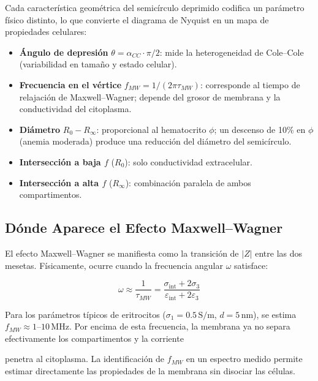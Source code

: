 \documentclass[12pt]{article}
\begin{document}
Cada caracter\'istica geom\'etrica del semic\'irculo deprimido codifica un par\'ametro f\'isico
distinto, lo que convierte el diagrama de Nyquist en un mapa de propiedades celulares:

\begin{itemize}

\item \textbf{\'Angulo de depresi\'on} $\theta = \alpha_{CC}\cdot\pi/2$: mide la
heterogeneidad de Cole--Cole (variabilidad en tama\~{n}o y estado celular).
\item \textbf{Frecuencia en el v\'ertice} $f_{MW} = 1/(2\pi\tau_{MW})$: corresponde al
tiempo de relajaci\'on de Maxwell--Wagner; depende del grosor de membrana y la
conductividad del citoplasma.
\item \textbf{Di\'ametro} $R_0 - R_\infty$: proporcional al hematocrito $\phi$; un
descenso de 10\% en $\phi$ (anemia moderada) produce una reducci\'on del di\'ametro
del semic\'irculo.
\item \textbf{Intersecci\'on a baja $f$} ($R_0$): solo conductividad extracelular.
\item \textbf{Intersecci\'on a alta $f$} ($R_\infty$): combinaci\'on paralela de ambos
compartimentos.
\end{itemize}

\subsection{D\'onde Aparece el Efecto Maxwell--Wagner}

\label{subsec:MW_loc}

El efecto Maxwell--Wagner se manifiesta como la transici\'on de $|Z|$ entre las dos mesetas.
F\'isicamente, ocurre cuando la frecuencia angular $\omega$ satisface:

\begin{equation}
\omega \approx \frac{1}{\tau_{MW}} =
\frac{\sigma_{\text{int}} + 2\sigma_3}{\varepsilon_{\text{int}} + 2\varepsilon_3}
\end{equation}

Para los par\'ametros t\'ipicos de eritrocitos ($\sigma_1 = 0.5\,\text{S/m}$, $d = 5\,\text{nm}$), se
estima $f_{MW} \approx 1$--$10\,\text{MHz}$. Por encima de esta
frecuencia, la membrana ya no separa efectivamente los compartimentos y la corriente

penetra al citoplasma. La identificaci\'on de $f_{MW}$ en un espectro medido permite
estimar directamente las propiedades de la membrana sin disociar las c\'elulas.
\end{document}
